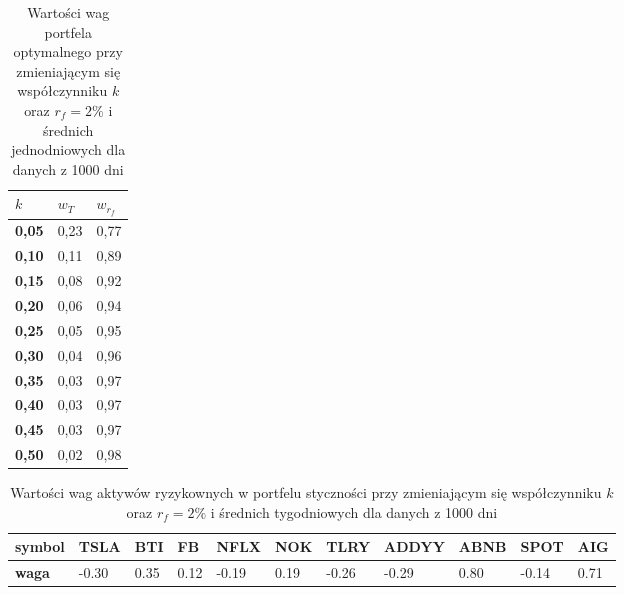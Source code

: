 \documentclass[magister]{dyplom}
\begin{document}
\begin{table}[ht]
	\centering
	\caption{Wartości wag portfela optymalnego przy zmieniającym się współczynniku $k$ oraz $r_f = 2\%$ i średnich jednodniowych dla danych z 1000 dni}
	\begin{tabular}{|l|l|l|}
		\hline
		\textbf{$k$} & \textbf{$w_T$} & \textbf{$w_{r_f}$} \\ \hline
		\textbf{0,05}                                             & 0,23          & 0,77           \\ \hline
		\textbf{0,10}                                             & 0,11          & 0,89           \\ \hline
		\textbf{0,15}                                             & 0,08          & 0,92           \\ \hline
		\textbf{0,20}                                             & 0,06          & 0,94           \\ \hline
		\textbf{0,25}                                             & 0,05          & 0,95           \\ \hline
		\textbf{0,30}                                             & 0,04          & 0,96           \\ \hline
		\textbf{0,35}                                             & 0,03          & 0,97           \\ \hline
		\textbf{0,40}                                             & 0,03          & 0,97           \\ \hline
		\textbf{0,45}                                             & 0,03          & 0,97           \\ \hline
		\textbf{0,50}                                             & 0,02          & 0,98           \\ \hline
	\end{tabular}
\end{table}
\begin{table}[ht]
	\centering
	\caption{Wartości wag aktywów ryzykownych w portfelu styczności przy zmieniającym się współczynniku $k$ oraz $r_f = 2\%$ i średnich tygodniowych dla danych z 1000 dni}
	\begin{tabular}{|l|l|l|l|l|l|l|l|l|l|l|}
		\hline
		\textbf{symbol} & \textbf{TSLA} & \textbf{BTI} & \textbf{FB} & \textbf{NFLX} & \textbf{NOK} & \textbf{TLRY} & \textbf{ADDYY} & \textbf{ABNB} & \textbf{SPOT} & \textbf{AIG} \\ \hline
		\textbf{waga}   & -0.30       & 0.35          & 0.12           & -0.19        & 0.19         & -0.26         & -0.29        & 0.80          & -0.14          & 0.71        \\ \hline
	\end{tabular}
\end{table}
\end{document}
